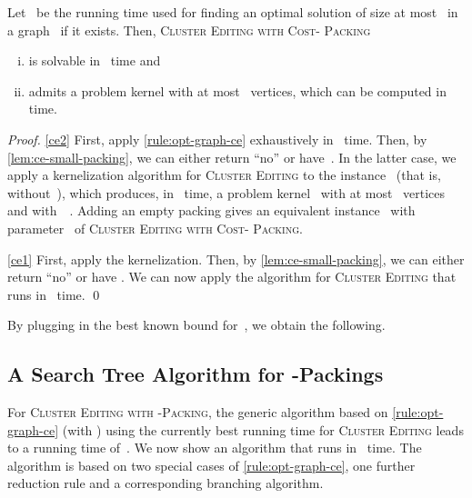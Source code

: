\documentclass[envcountsame,numbook,smallextended]{svjour3}
\numberwithin{equation}{section}
\numberwithin{figure}{section}
\newcommand{\CEGP}{\textsc{Cluster Editing with  Cost- Packing}}
\newcommand{\CEPP}{\textsc{Cluster Editing with  -Packing}}
\begin{document}
\begin{theorem}\label{thm:ce-time}
Let ~be the running time used for finding an optimal solution of size at most~ in a graph~ if it exists. Then,  \CEGP{}
\begin{enumerate}[(i)]
\item\label{ce1} is solvable in~ time and
\item\label{ce2} admits a problem kernel with at most~ vertices, which can be computed in~ time.
\end{enumerate}
\end{theorem}
\begin{proof}
  \eqref{ce2}
  First, apply \cref{rule:opt-graph-ce} exhaustively
  in~ time.
  Then,
  by \cref{lem:ce-small-packing},
  we can either return ``no''
  or have~.
  In the latter case,
  we apply a kernelization algorithm
  for \textsc{Cluster Editing} to the instance~
  (that is, without~),
  which produces, in ~time,
  a problem kernel~
  with at most~ vertices
  and with~~\cite{CM12}.
  Adding an empty packing gives
  an equivalent instance~
  with parameter~ of \CEGP.

  \eqref{ce1} First, apply the kernelization.
  Then, by \cref{lem:ce-small-packing},
  we can either return ``no''
  or have .
  We can now apply the algorithm
  for \textsc{Cluster Editing}
  that runs in ~time. \qed\end{proof} 
By plugging in the best known bound for~,
we obtain the following.


\subsection{A Search Tree Algorithm for -Packings}
\label{sec:p3p}
For \CEPP,
the generic algorithm based on \cref{rule:opt-graph-ce}
(with )
using the currently best running time
for \textsc{Cluster Editing}
leads to a running time of~.
We now show an algorithm that runs
in ~time.
The algorithm is based on two special cases
of \cref{rule:opt-graph-ce},
one further reduction rule
and a corresponding branching algorithm.
\end{document}
